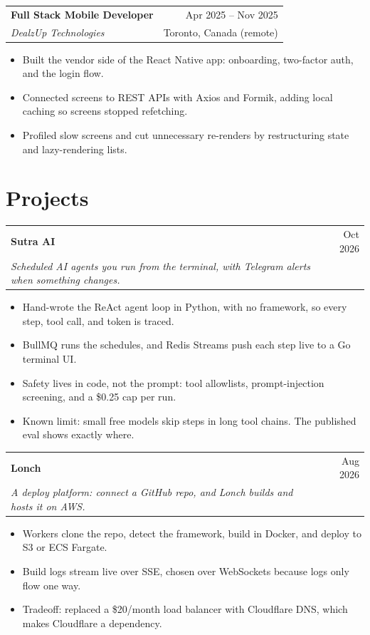 \documentclass[a4paper,11pt]{article}
\makeatletter
\newcommand{\entrygap}{\vspace{6pt}}
\newcommand{\sep}{\enspace\textperiodcentered\enspace}
\newcommand{\stack}[1]{{\small\color{muted}#1}}
\newcommand{\entry}[4]{%
  \begin{tabular*}{\textwidth}{@{}l@{\extracolsep{\fill}}r@{}}
    \textbf{#1} & \small #2 \\
    \small\textit{#3} & \small #4
  \end{tabular*}\par
}
\newcommand{\project}[6]{%
  \begin{tabular*}{\textwidth}{@{}l@{\extracolsep{\fill}}r@{}}
    \textbf{#1}\enspace{\small\href{#2}{GitHub}\sep\href{#3}{Live}}\sep\stack{#4} & \small #5 \\
    \small\textit{#6} &
  \end{tabular*}\par
}
\newenvironment{bullets}
  {\begin{itemize}[leftmargin=1.1em, labelsep=0.5em, topsep=2pt, itemsep=1pt, parsep=0pt, partopsep=0pt, label=\textbullet]\small}
  {\end{itemize}}
\makeatother
\begin{document}
\entrygap
\entry{Full Stack Mobile Developer}{Apr 2025 -- Nov 2025}{DealzUp Technologies}{Toronto, Canada (remote)}
\begin{bullets}
  \item Built the vendor side of the React Native app: onboarding, two-factor auth, and the login flow.
  \item Connected screens to REST APIs with Axios and Formik, adding local caching so screens stopped refetching.
  \item Profiled slow screens and cut unnecessary re-renders by restructuring state and lazy-rendering lists.
\end{bullets}


\section{Projects}
\project{Sutra AI}{https://github.com/iCoderabhishek/Sutra-AI}{https://sutraai.0bhishek.com}
  {Python, FastAPI, Go, TypeScript, BullMQ, Redis}{Oct 2026}
  {Scheduled AI agents you run from the terminal, with Telegram alerts when something changes.}
\begin{bullets}
  \item Hand-wrote the ReAct agent loop in Python, with no framework, so every step, tool call, and token is traced.
  \item BullMQ runs the schedules, and Redis Streams push each step live to a Go terminal UI.
  \item Safety lives in code, not the prompt: tool allowlists, prompt-injection screening, and a \$0.25 cap per run.
  \item Known limit: small free models skip steps in long tool chains. The published eval shows exactly where.
\end{bullets}

\entrygap
\project{Lonch}{https://github.com/iCoderabhishek/Lonch}{https://lonch.cloud}
  {Node.js, Docker, AWS ECS, S3, BullMQ}{Aug 2026}
  {A deploy platform: connect a GitHub repo, and Lonch builds and hosts it on AWS.}
\begin{bullets}
  \item Workers clone the repo, detect the framework, build in Docker, and deploy to S3 or ECS Fargate.
  \item Build logs stream live over SSE, chosen over WebSockets because logs only flow one way.
  \item Tradeoff: replaced a \$20/month load balancer with Cloudflare DNS, which makes Cloudflare a dependency.
\end{bullets}
\end{document}
